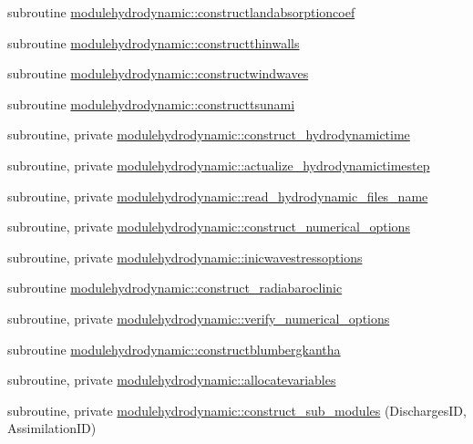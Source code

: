 \begin{DoxyCompactItemize}
\item 
subroutine \mbox{\hyperlink{namespacemodulehydrodynamic_a25b15c0ef46c1b48f735915c9ffdd9c2}{modulehydrodynamic\+::constructlandabsorptioncoef}}
\item 
subroutine \mbox{\hyperlink{namespacemodulehydrodynamic_a072dc4d4b10aa4a8338fa245f13abfec}{modulehydrodynamic\+::constructthinwalls}}
\item 
subroutine \mbox{\hyperlink{namespacemodulehydrodynamic_acf1676d4429b32307257ed7006fc59e1}{modulehydrodynamic\+::constructwindwaves}}
\item 
subroutine \mbox{\hyperlink{namespacemodulehydrodynamic_a4884a32bf5be45ca0a9b657f2998efa7}{modulehydrodynamic\+::constructtsunami}}
\item 
subroutine, private \mbox{\hyperlink{namespacemodulehydrodynamic_adacb48ce53fa202c94f8c282a714e069}{modulehydrodynamic\+::construct\+\_\+hydrodynamictime}}
\item 
subroutine, private \mbox{\hyperlink{namespacemodulehydrodynamic_a1df79abd6d7bd327711cac635586b443}{modulehydrodynamic\+::actualize\+\_\+hydrodynamictimestep}}
\item 
subroutine, private \mbox{\hyperlink{namespacemodulehydrodynamic_a38cc357414f891bddecb56ab805ed45b}{modulehydrodynamic\+::read\+\_\+hydrodynamic\+\_\+files\+\_\+name}}
\item 
subroutine, private \mbox{\hyperlink{namespacemodulehydrodynamic_aec1826f2eaf93245fac759d36238b464}{modulehydrodynamic\+::construct\+\_\+numerical\+\_\+options}}
\item 
subroutine, private \mbox{\hyperlink{namespacemodulehydrodynamic_a95bd184509c8f6ec79226d6c0d2fac28}{modulehydrodynamic\+::inicwavestressoptions}}
\item 
subroutine \mbox{\hyperlink{namespacemodulehydrodynamic_a2c1b59ad00ab5b15fcde63fd663d2f54}{modulehydrodynamic\+::construct\+\_\+radiabaroclinic}}
\item 
subroutine, private \mbox{\hyperlink{namespacemodulehydrodynamic_a7c3dd39beec17720b08c54e61c02ecc8}{modulehydrodynamic\+::verify\+\_\+numerical\+\_\+options}}
\item 
subroutine \mbox{\hyperlink{namespacemodulehydrodynamic_afd2aaa7b8dac18e2bd28abcf31a9cb16}{modulehydrodynamic\+::constructblumbergkantha}}
\item 
subroutine, private \mbox{\hyperlink{namespacemodulehydrodynamic_a0f6a249ae16b4abbfcead3fdc4641a89}{modulehydrodynamic\+::allocatevariables}}
\item 
subroutine, private \mbox{\hyperlink{namespacemodulehydrodynamic_acaa5f838138b21f2c4d3c245177ae6bf}{modulehydrodynamic\+::construct\+\_\+sub\+\_\+modules}} (Discharges\+ID, Assimilation\+ID)

\end{DoxyCompactItemize}
